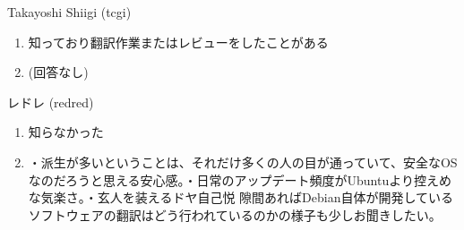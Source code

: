 \begin{prework}{ Takayoshi Shiigi (tcgi) }
  \begin{enumerate}
  \item 知っており翻訳作業またはレビューをしたことがある
  \item (回答なし)
  \end{enumerate}
\end{prework}

\begin{prework}{ レドレ (redred) }
  \begin{enumerate}
  \item 知らなかった
  \item ・派生が多いということは、それだけ多くの人の目が通っていて、安全なOSなのだろうと思える安心感。・日常のアップデート頻度がUbuntuより控えめな気楽さ。・玄人を装えるドヤ自己悦 隙間あればDebian自体が開発しているソフトウェアの翻訳はどう行われているのかの様子も少しお聞きしたい。
  \end{enumerate}
\end{prework}
